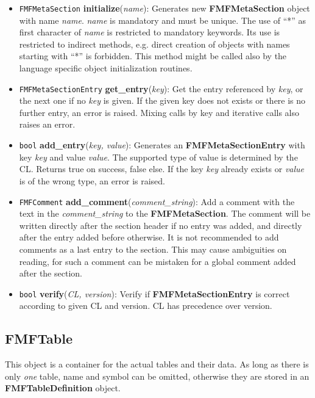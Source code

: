 \documentclass[10pt,utf8, mainlanguage=english]{ufcd-info}
\newcommand{\fret}[1]{{\texttt{#1}}}
\newcommand{\fcal}[2]{{\textbf{#1}}(\textit{#2})}
\newcommand{\fmfobj}[1]{{\textbf{\textsf{#1}}}}
\begin{document}
\begin{itemize}
	\item \fret{FMFMetaSection} \fcal{initialize}{name}: Generates new \fmfobj{FMFMetaSection} object with name \textit{name}. \textit{name} is mandatory and must be unique. The use of \enquote{*} as first character of \textit{name} is restricted to mandatory keywords. Its use is restricted to indirect methods, e.g. direct creation of objects with names starting with \enquote{*} is forbidden. This method might be called also by the language specific object initialization routines.

	\item \fret{FMFMetaSectionEntry} \fcal{get\_entry}{key}: Get the entry referenced by {\sl key}, or the next one if no \textit{key} is given. If the given key does not exists or there is no further entry, an error is raised. Mixing calls by key and iterative calls also raises an error.

	\item \fret{bool} \fcal{add\_entry}{key, value}: Generates an \fmfobj{FMFMetaSectionEntry} with key \textit{key} and value \textit{value}. The supported type of value is determined by the CL. Returns true on success, false else. If the key \textit{key} already exists or \textit{value} is of the wrong type, an error is raised.

	\item \fret{FMFComment} \fcal{add\_comment}{comment\_string}: Add a comment with the text in the \textit{comment\_string} to the \fmfobj{FMFMetaSection}. The comment will be written directly after the section header if no entry was added, and directly after the entry added before otherwise. It is not recommended to add comments as a last entry to the section. This may cause ambiguities on reading, for such a comment can be mistaken for a global comment added after the section.

	\item \fret{bool} \fcal{verify}{CL, version}: Verify if \fmfobj{FMFMetaSectionEntry} is correct according to given CL and version. CL has precedence over version.
\end{itemize}

\subsection{FMFTable}\label{subsec:FMFTable}

This object is a container for the actual tables and their data. As long as there is only \emph{one} table, name and symbol can be omitted, otherwise they are stored in an \fmfobj{FMFTableDefinition} object.
\end{document}
